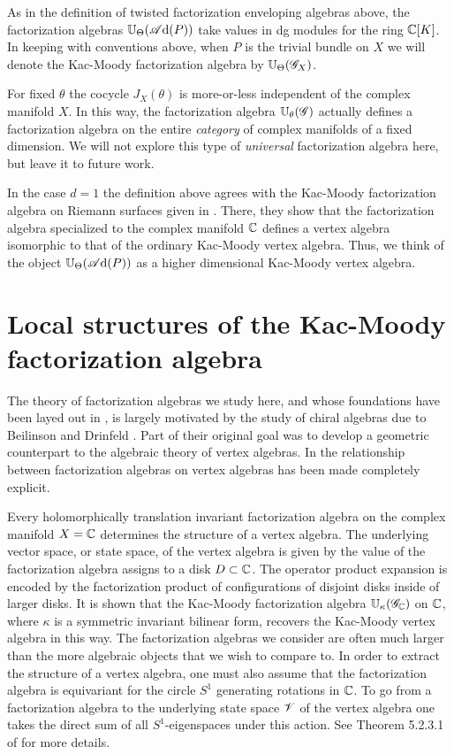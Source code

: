 \begin{rmk} 
As in the definition of twisted factorization enveloping algebras above, the factorization algebras $\mathbb U_\Theta(\mathscr A{\rm d}(P))$ take values in dg modules for the ring $\mathbb C[K]$. 
In keeping with conventions above, when $P$ is the trivial bundle on $X$ we will denote the Kac-Moody factorization algebra by $\mathbb U_\Theta(\mathscr G_X)$. 
\end{rmk}

\begin{rmk}
For fixed $\theta$ the cocycle $J_X(\theta)$ is more-or-less independent of the complex manifold $X$.
In this way, the factorization algebra $\mathbb U_\theta (\mathscr G)$ actually defines a factorization algebra on the entire {\em category} of complex manifolds of a fixed dimension.
We will not explore this type of {\em universal} factorization algebra here, but leave it to future work.
\end{rmk}

In the case $d = 1$ the definition above agrees with the Kac-Moody factorization algebra on Riemann surfaces given in \cite{CG1}.
There, they show that the factorization algebra specialized to the complex manifold $\mathbb C$ defines a vertex algebra isomorphic to that of the ordinary Kac-Moody vertex algebra.
Thus, we think of the object $\mathbb U_\Theta(\mathscr A{\rm d}(P))$ as a higher dimensional Kac-Moody vertex algebra.

\section{Local structures of the Kac-Moody factorization algebra} \label{sec: sphere ops}

The theory of factorization algebras we study here, and whose foundations have been layed out in \cite{CG1}, is largely motivated by the study of chiral algebras due to Beilinson and Drinfeld \cite{BD}.
Part of their original goal was to develop a geometric counterpart to the algebraic theory of vertex algebras. 
In \cite{CG1} the relationship between factorization algebras on vertex algebras has been made completely explicit. 

Every holomorphically translation invariant factorization algebra on the complex manifold $X = \mathbb C$ determines the structure of a vertex algebra.
The underlying vector space, or state space, of the vertex algebra is given by the value of the factorization algebra assigns to a disk $D \subset \mathbb C$. 
The operator product expansion is encoded by the factorization product of configurations of disjoint disks inside of larger disks. 
It is shown that the Kac-Moody factorization algebra $\mathbb U_{\kappa}(\mathscr G_\mathbb C)$ on $\mathbb C$, where $\kappa$ is a symmetric invariant bilinear form, recovers the Kac-Moody vertex algebra in this way. 
The factorization algebras we consider are often much larger than the more algebraic objects that we wish to compare to. 
In order to extract the structure of a vertex algebra, one must also assume that the factorization algebra is equivariant for the circle $S^1$ generating rotations in $\mathbb C$. 
To go from a factorization algebra to the underlying state space $\mathscr V$ of the vertex algebra one takes the direct sum of all $S^1$-eigenspaces under this action. 
See Theorem 5.2.3.1 of \cite{CG1} for more details.

